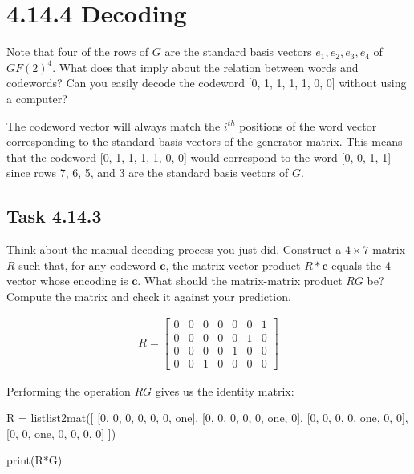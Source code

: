 \documentclass[
  letterpaper,
  DIV=11,
  numbers=noendperiod]{scrartcl}
\newenvironment{Shaded}{\begin{snugshade}}{\end{snugshade}}
\newcommand{\BuiltInTok}[1]{\textcolor[rgb]{0.00,0.23,0.31}{#1}}
\newcommand{\DecValTok}[1]{\textcolor[rgb]{0.68,0.00,0.00}{#1}}
\newcommand{\NormalTok}[1]{\textcolor[rgb]{0.00,0.23,0.31}{#1}}
\newcommand{\OperatorTok}[1]{\textcolor[rgb]{0.37,0.37,0.37}{#1}}
\begin{document}
\hypertarget{decoding}{%
\section{4.14.4 Decoding}\label{decoding}}

Note that four of the rows of \(G\) are the standard basis vectors
\(e_1, e_2, e_3, e_4\) of \(GF(2)^4\). What does that imply about the
relation between words and codewords? Can you easily decode the codeword
{[}0, 1, 1, 1, 1, 0, 0{]} without using a computer?

The codeword vector will always match the \(i^{th}\) positions of the
word vector corresponding to the standard basis vectors of the generator
matrix. This means that the codeword {[}0, 1, 1, 1, 1, 0, 0{]} would
correspond to the word {[}0, 0, 1, 1{]} since rows 7, 6, 5, and 3 are
the standard basis vectors of \(G\).

\hypertarget{task-4.14.3}{%
\subsection{Task 4.14.3}\label{task-4.14.3}}

Think about the manual decoding process you just did. Construct a
\(4 \times 7\) matrix \(R\) such that, for any codeword \(\bm{c}\), the
matrix-vector product \(R*\bm{c}\) equals the 4-vector whose encoding is
\(\bm{c}\). What should the matrix-matrix product \(RG\) be? Compute the
matrix and check it against your prediction.

\begin{align*}
R = \begin{bmatrix} 0 & 0 & 0 & 0 & 0 & 0 & 1\\ 0 & 0 & 0 & 0 & 0 & 1 & 0\\ 0 & 0 & 0 & 0 & 1 & 0 & 0\\ 0 & 0 & 1 & 0 & 0 & 0 & 0 \end{bmatrix}
\end{align*}

Performing the operation \(RG\) gives us the identity matrix:

\begin{Shaded}
\begin{Highlighting}[numbers=left,,]
\NormalTok{R }\OperatorTok{=}\NormalTok{ listlist2mat([}
\NormalTok{[}\DecValTok{0}\NormalTok{, }\DecValTok{0}\NormalTok{, }\DecValTok{0}\NormalTok{, }\DecValTok{0}\NormalTok{, }\DecValTok{0}\NormalTok{, }\DecValTok{0}\NormalTok{, one],}
\NormalTok{[}\DecValTok{0}\NormalTok{, }\DecValTok{0}\NormalTok{, }\DecValTok{0}\NormalTok{, }\DecValTok{0}\NormalTok{, }\DecValTok{0}\NormalTok{, one, }\DecValTok{0}\NormalTok{],}
\NormalTok{[}\DecValTok{0}\NormalTok{, }\DecValTok{0}\NormalTok{, }\DecValTok{0}\NormalTok{, }\DecValTok{0}\NormalTok{, one, }\DecValTok{0}\NormalTok{, }\DecValTok{0}\NormalTok{],}
\NormalTok{[}\DecValTok{0}\NormalTok{, }\DecValTok{0}\NormalTok{, one, }\DecValTok{0}\NormalTok{, }\DecValTok{0}\NormalTok{, }\DecValTok{0}\NormalTok{, }\DecValTok{0}\NormalTok{]}
\NormalTok{])}

\BuiltInTok{print}\NormalTok{(R}\OperatorTok{*}\NormalTok{G)}
\end{Highlighting}
\end{Shaded}
\end{document}
